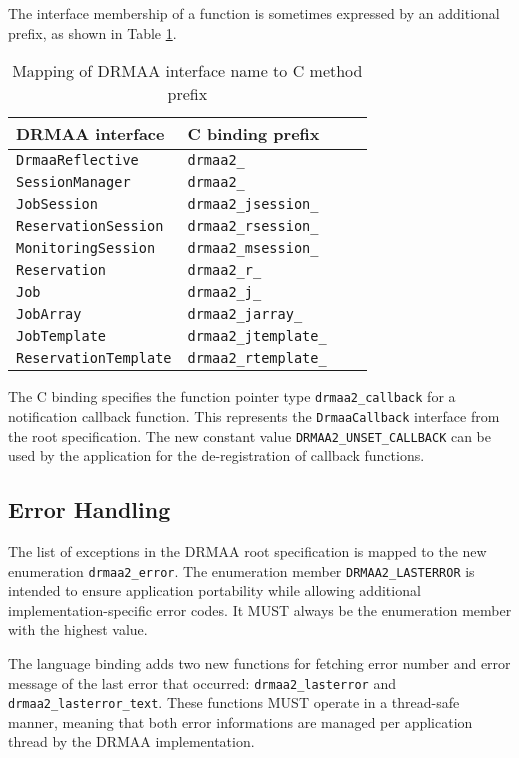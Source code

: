 \documentclass{article}
\newcommand{\h}[1]{\texttt{#1}}
\begin{document}
The interface membership of a function is sometimes expressed by an additional prefix, as shown in Table \ref{tab:naming}.

\begin{table}[ht]
\centering
\begin{tabularx}{\textwidth}{|X|X|l|X|}
\hline
DRMAA interface & C binding prefix \\
\hline
\h{DrmaaReflective} & \h{drmaa2\_} \\
\h{SessionManager} & \h{drmaa2\_} \\
\h{JobSession} & \h{drmaa2\_jsession\_} \\
\h{ReservationSession} & \h{drmaa2\_rsession\_} \\
\h{MonitoringSession}  & \h{drmaa2\_msession\_} \\
\h{Reservation} & \h{drmaa2\_r\_} \\
\h{Job} & \h{drmaa2\_j\_} \\
\h{JobArray} & \h{drmaa2\_jarray\_} \\
\h{JobTemplate} & \h{drmaa2\_jtemplate\_} \\
\h{ReservationTemplate} & \h{drmaa2\_rtemplate\_} \\
\hline
\end{tabularx}
\caption{Mapping of DRMAA interface name to C method prefix}
\label{tab:naming}
\end{table}

The C binding specifies the function pointer type \h{drmaa2\_callback} for a notification callback function. This represents the \h{DrmaaCallback} interface from the root specification. The new constant value \h{DRMAA2\_UNSET\_CALLBACK} can be used by the application for the de-registration of callback functions.

\subsection{Error Handling}

The list of exceptions in the DRMAA root specification is mapped to the new enumeration \h{drmaa2\_error}. The enumeration member \h{DRMAA2\_LASTERROR} is intended to ensure application portability while allowing additional implementation-specific error codes. It MUST always be the enumeration member with the highest value.

The language binding adds two new functions for fetching error number and error message of the last error that occurred: \h{drmaa2\_lasterror} and \h{drmaa2\_lasterror\_text}. These functions MUST operate in a thread-safe manner, meaning that both error informations are managed per application thread by the DRMAA implementation.  
\end{document}
